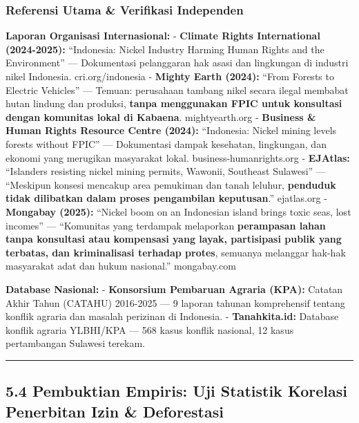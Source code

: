 \documentclass[
]{article}
\begin{document}
\subsubsection{Referensi Utama \& Verifikasi
Independen}\label{referensi-utama-verifikasi-independen}

\textbf{Laporan Organisasi Internasional:} - \textbf{Climate Rights
International (2024-2025):} ``Indonesia: Nickel Industry Harming Human
Rights and the Environment'' --- Dokumentasi pelanggaran hak asasi dan
lingkungan di industri nikel Indonesia. cri.org/indonesia -
\textbf{Mighty Earth (2024):} ``From Forests to Electric Vehicles'' ---
Temuan: perusahaan tambang nikel secara ilegal membabat hutan lindung
dan produksi, \textbf{tanpa menggunakan FPIC untuk konsultasi dengan
komunitas lokal di Kabaena}. mightyearth.org - \textbf{Business \& Human
Rights Resource Centre (2024):} ``Indonesia: Nickel mining levels
forests without FPIC'' --- Dokumentasi dampak kesehatan, lingkungan, dan
ekonomi yang merugikan masyarakat lokal. business-humanrights.org -
\textbf{EJAtlas:} ``Islanders resisting nickel mining permits, Wawonii,
Southeast Sulawesi'' --- ``Meskipun konsesi mencakup area pemukiman dan
tanah leluhur, \textbf{penduduk tidak dilibatkan dalam proses
pengambilan keputusan}.'' ejatlas.org - \textbf{Mongabay (2025):}
``Nickel boom on an Indonesian island brings toxic seas, lost incomes''
--- ``Komunitas yang terdampak melaporkan \textbf{perampasan lahan tanpa
konsultasi atau kompensasi yang layak, partisipasi publik yang terbatas,
dan kriminalisasi terhadap protes}, semuanya melanggar hak-hak
masyarakat adat dan hukum nasional.'' mongabay.com

\textbf{Database Nasional:} - \textbf{Konsorsium Pembaruan Agraria
(KPA):} Catatan Akhir Tahun (CATAHU) 2016-2025 --- 9 laporan tahunan
komprehensif tentang konflik agraria dan masalah perizinan di Indonesia.
- \textbf{Tanahkita.id:} Database konflik agraria YLBHI/KPA --- 568
kasus konflik nasional, 12 kasus pertambangan Sulawesi terekam.

\begin{center}\rule{0.5\linewidth}{0.5pt}\end{center}

\subsection{5.4 Pembuktian Empiris: Uji Statistik Korelasi Penerbitan
Izin \&
Deforestasi}\label{pembuktian-empiris-uji-statistik-korelasi-penerbitan-izin-deforestasi}
\end{document}
